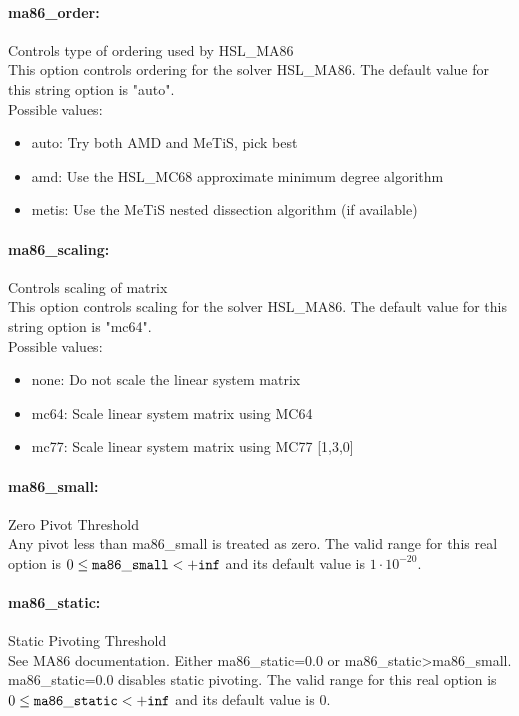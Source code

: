 \paragraph{ma86\_order:}\label{opt:ma86_order} Controls type of ordering used by HSL\_MA86 \\
 This option controls ordering for the solver HSL\_MA86. The default value for this string option is "auto".
\\ 
Possible values:
\begin{itemize}
   \item auto: Try both AMD and MeTiS, pick best
   \item amd: Use the HSL\_MC68 approximate minimum degree algorithm
   \item metis: Use the MeTiS nested dissection algorithm (if available)
\end{itemize}

\paragraph{ma86\_scaling:}\label{opt:ma86_scaling} Controls scaling of matrix \\
 This option controls scaling for the solver HSL\_MA86. The default value for this string option is "mc64".
\\ 
Possible values:
\begin{itemize}
   \item none: Do not scale the linear system matrix
   \item mc64: Scale linear system matrix using MC64
   \item mc77: Scale linear system matrix using MC77 [1,3,0]
\end{itemize}

\paragraph{ma86\_small:}\label{opt:ma86_small} Zero Pivot Threshold \\
 Any pivot less than ma86\_small is treated as zero. The valid range for this real option is 
$0 \le {\tt ma86\_small } <  {\tt +inf}$
and its default value is $1 \cdot 10^{-20}$.


\paragraph{ma86\_static:}\label{opt:ma86_static} Static Pivoting Threshold \\
 See MA86 documentation. Either ma86\_static=0.0 or ma86\_static>ma86\_small. ma86\_static=0.0 disables static pivoting. The valid range for this real option is 
$0 \le {\tt ma86\_static } <  {\tt +inf}$
and its default value is $0$.


